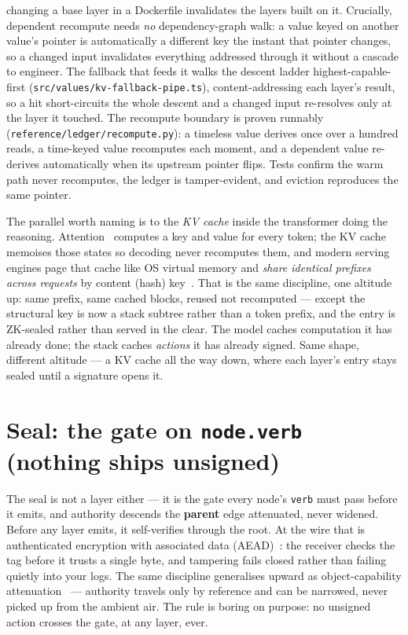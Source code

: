 \documentclass[11pt]{article}
\begin{document}
changing a base layer in a Dockerfile invalidates the layers built on it. Crucially,
dependent recompute needs \emph{no} dependency-graph walk: a value keyed on another
value's pointer is automatically a different key the instant that pointer changes, so a
changed input invalidates everything addressed through it without a cascade to engineer.
The fallback that feeds it walks the descent ladder highest-capable-first
(\texttt{src/values/kv-fallback-pipe.ts}), content-addressing each layer's result, so a
hit short-circuits the whole descent and a changed input re-resolves only at the layer
it touched. The recompute boundary is proven runnably
(\texttt{reference/ledger/recompute.py}): a timeless value derives once over a hundred
reads, a time-keyed value recomputes each moment, and a dependent value re-derives
automatically when its upstream pointer flips. Tests confirm the warm path never
recomputes, the ledger is tamper-evident, and eviction reproduces the same pointer.


The parallel worth naming is to the \emph{KV cache} inside the transformer doing
the reasoning. Attention~\cite{attention} computes a key and value for every token;
the KV cache memoises those states so decoding never recomputes them, and modern
serving engines page that cache like OS virtual memory and \emph{share identical
prefixes across requests} by content (hash) key~\cite{pagedattention}. That is the
same discipline, one altitude up: same prefix, same cached blocks, reused not
recomputed --- except the structural key is now a stack subtree rather than a
token prefix, and the entry is ZK-sealed rather than served in the clear. The model
caches computation it has already done; the stack caches \emph{actions} it has
already signed. Same shape, different altitude --- a KV cache all the way down,
where each layer's entry stays sealed until a signature opens it.
\section{Seal: the gate on \texttt{node.verb} (nothing ships unsigned)}

The seal is not a layer either --- it is the gate every node's \texttt{verb} must pass
before it emits, and authority descends the \textbf{parent} edge attenuated, never
widened. Before any layer emits, it self-verifies through the root. At the wire that is
authenticated encryption with associated data (AEAD)~\cite{rfc5116}: the receiver
checks the tag before it trusts a single byte, and tampering fails closed rather
than failing quietly into your logs. The same discipline generalises upward as
object-capability attenuation~\cite{ocap} --- authority travels only by reference
and can be narrowed, never picked up from the ambient air. The rule is boring on
purpose: no unsigned action crosses the gate, at any layer, ever.
\end{document}
